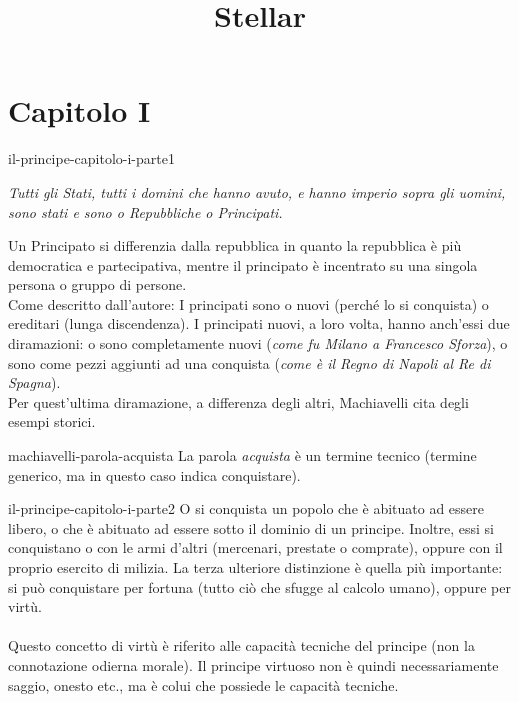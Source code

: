 \documentclass[preview]{standalone}
\begin{document}
\title{Stellar}
\genpage

\section{Capitolo I}

\begin{snippet}{il-principe-capitolo-i-parte1}
    \begin{center}
        \begin{minipage}{0.75\textwidth}
            \itshape
            Tutti gli Stati, tutti i domini che hanno avuto, e hanno imperio sopra gli uomini, sono stati e sono o Repubbliche o Principati.
        \end{minipage}
    \end{center}
    \vspace{0.25cm}
    Un Principato si differenzia dalla repubblica in quanto la repubblica è più democratica e partecipativa,
    mentre il principato è incentrato su una singola persona o gruppo di persone. \\
    Come descritto dall'autore: I principati sono o nuovi (perché lo si conquista) o ereditari (lunga discendenza).
    I principati nuovi, a loro volta, hanno anch'essi due diramazioni:
    o sono completamente nuovi (\textit{come fu Milano a Francesco Sforza}),
    o sono come pezzi aggiunti ad una conquista
    (\textit{come è il Regno di Napoli al Re di Spagna}). \\
    Per quest'ultima diramazione, a differenza degli altri, Machiavelli cita degli esempi storici.
\end{snippet}

\begin{snippetnote}{machiavelli-parola-acquista}{}
    La parola \textit{acquista} è un termine tecnico (termine generico, ma in questo caso indica conquistare).
\end{snippetnote}

\begin{snippet}{il-principe-capitolo-i-parte2}
    O si conquista un popolo che è abituato ad essere libero, o che è abituato ad
    essere sotto il dominio di un principe.
    Inoltre, essi si conquistano o con le armi d'altri (mercenari, prestate o comprate),
    oppure con il proprio esercito di milizia.
    La terza ulteriore distinzione è quella più importante: si può conquistare per fortuna (tutto ciò che sfugge al calcolo umano),
    oppure per virtù.
    \\\\
    Questo concetto di virtù è riferito alle capacità tecniche del principe (non la connotazione odierna morale).
    Il principe virtuoso non è quindi necessariamente saggio, onesto etc., ma è colui che
    possiede le capacità tecniche.
\end{snippet}
\end{document}
